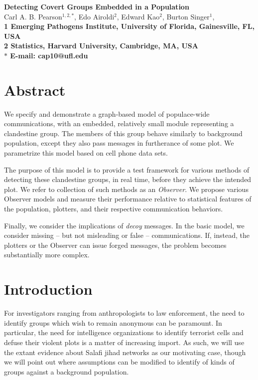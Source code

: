 \documentclass{article}
\begin{document}
\begin{flushleft}
{\Large
\textbf{Detecting Covert Groups Embedded in a Population}
}
\\
Carl A. B. Pearson$^{1,2,\ast}$, 
Edo Airoldi$^{2}$, 
Edward Kao$^{2}$,
Burton Singer$^{1}$, 
\\
\bf{1} Emerging Pathogens Institute, University of Florida, Gainesville, FL, USA
\\
\bf{2} Statistics, Harvard University, Cambridge, MA, USA
\\
$\ast$ E-mail: cap10@ufl.edu
\end{flushleft}
\section*{Abstract}
We specify and demonstrate a graph-based model of populace-wide communications, with an embedded, relatively small module representing a clandestine group.  The members of this group behave similarly to background population, except they also pass messages in furtherance of some plot.  We parametrize this model based on cell phone data sets.

The purpose of this model is to provide a test framework for various methods of detecting these clandestine groups, in real time, before they achieve the intended plot.  We refer to collection of such methods as an {\em Observer}.  We propose various Observer models and measure their performance relative to statistical features of the population, plotters, and their respective communication behaviors.

Finally, we consider the implications of {\em decoy} messages.  In the basic model, we consider missing -- but not misleading or false -- communications.  If, instead, the plotters or the Observer can issue forged messages, the problem becomes substantially more complex.

\section*{Introduction}
For investigators ranging from anthropologists to law enforcement, the need to identify groups which wish to remain anonymous can be paramount.  In particular, the need for intelligence organizations to identify terrorist cells and defuse their violent plots is a matter of increasing import.  As such, we will use the extant evidence about Salafi jihad networks as our motivating case\cite{sageman}, though we will point out where assumptions can be modified to identify of kinds of groups against a background population. 
\end{document}
